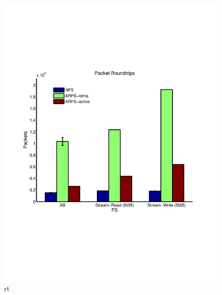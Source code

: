 \documentclass[10pt]{article}
\begin{document}
\begin{figure}
  \centering
\includegraphics[scale=0.5, trim = 0 200 0 200]{../../results/matlab/rt.pdf}
  \caption{rt}\label{rt}
\end{figure}
\end{document}
